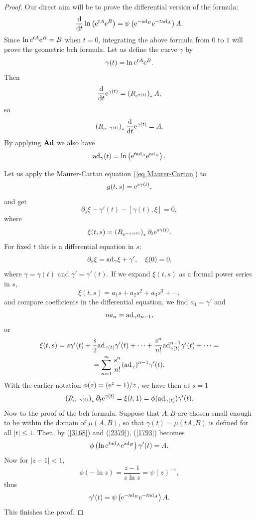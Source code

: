 \begin{proof}
    Our direct aim will be to prove the differential version of the formula:
    \[\frac{{\mathrm{d}}}{{\mathrm{d}} t}\ln\left(\mathrm{e}^{tA} \mathrm{e}^B\right)=\psi\left(\mathrm{e}^{-\mathrm{ad}_B}\mathrm{e}^{-t\mathrm{ad}_A}\right)A.\]
    Since $\ln \mathrm{e}^{tA} \mathrm{e}^{B}=B$ when $t=0$, integrating the above formula from $0$ to $1$ will prove the geometric \gls{bch} formula. Let us define the curve $\gamma$ by
    \[\gamma(t)=\ln \mathrm{e}^{tA} \mathrm{e}^{B}.\]
    Then
    \[\frac{{\mathrm{d}}}{{\mathrm{d}} t} \mathrm{e}^{\gamma(t)}=\left(R_{\mathrm{e}^{\gamma(t)}}\right)_\ast A,\]
    so
    \[\left(R_{\mathrm{e}^{-\gamma(t)}}\right)_\ast\frac{{\mathrm{d}}}{{\mathrm{d}} t}\mathrm{e}^{\gamma(t)}=A.\label{2379}\]
    By applying $\mathrm{\mathbf{Ad}}$ we also have
    \[\mathrm{ad}_\gamma(t)=\ln\left(\mathrm{e}^{t\mathrm{ad}_A}\mathrm{e}^{\mathrm{ad}_{B}}\right).\label{3168}\]
    
    Let us apply the Maurer-Cartan equation (\ref{eq Maurer-Cartan}) to
    \[g(t,s)=\mathrm{e}^{s\gamma(t)},\]
    and get 
    \[\partial_s \xi-\gamma'(t)-[\gamma(t),\xi]=0,\]
    where 
    \[\xi(t,s)=\left(R_{\mathrm{e}^{-s\gamma(t)}}\right)_\ast\partial_t \mathrm{e}^{s\gamma(t)}.\]
    For fixed $t$ this is a differential equation in $s$:
    \[\partial_s\xi=\mathrm{ad}_\gamma\xi+\gamma',\quad \xi(0)=0,\]
    where $\gamma=\gamma(t)$ and $\gamma'=\gamma'(t)$. If we expand $\xi(t,s)$ as a formal power series in $s$,
    \[\xi(t,s)=a_1s+a_2s^2+a_3s^3+\cdots,\]
    and compare coefficients in the differential equation, we find $a_1=\gamma'$ and 
    \[na_n=\mathrm{ad}_\gamma a_{n-1},\]
    or 
    \begin{multline}
        \xi(t,s)=s\gamma'(t)+\frac{s}{2}\mathrm{ad}_{\gamma(t)}\gamma'(t)+\cdots+\frac{s^n}{n!}\mathrm{ad}_{\gamma(t)}^{n-1}\gamma'(t)+\cdots=\\=\sum_{n=1}^\infty \frac{s^n}{n!}(\mathrm{ad}_\gamma)^{n-1}\gamma'(t).
    \end{multline}
    With the earlier notation $\phi(z)=(\mathrm{e}^z-1)/z$, we have then at $s=1$
    \[\left(R_{\mathrm{e}^{-\gamma(t)}}\right)_\ast \partial_t \mathrm{e}^{\gamma(t)}=\xi(t,1)=\phi(\mathrm{ad}_{\gamma(t)})\gamma'(t).\label{1793}\]
    Now to the proof of the \gls{bch} formula. Suppose that $A,B$ are chosen small enough to be within the domain of $\mu(A,B)$, so that $\gamma(t)=\mu(tA,B)$ is defined for all $|t|\leq 1$. Then, by (\ref{3168}) and (\ref{2379}), (\ref{1793}) becomes
    \[\phi\left(\ln \mathrm{e}^{t\mathrm{ad}_A}\mathrm{e}^{\mathrm{ad}_B}\right)\gamma'(t)=A.\]
    Now for $|z-1|<1$,
    \[\phi(-\ln z)=\frac{z-1}{z\ln z}=\psi(z)^{-1},\]
    thus
    \[\gamma'(t)=\psi\left(\mathrm{e}^{-\mathrm{ad}_B}\mathrm{e}^{-t\mathrm{ad}_A}\right)A.\]
    This finishes the proof.
\end{proof}






